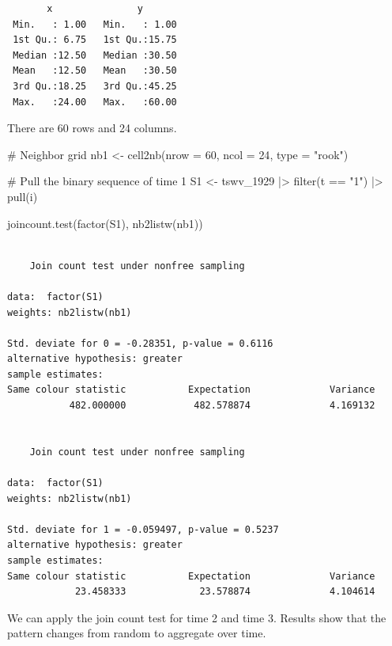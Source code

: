 \documentclass[
  letterpaper,
]{book}
\newenvironment{Shaded}{\begin{snugshade}}{\end{snugshade}}
\newcommand{\AttributeTok}[1]{\textcolor[rgb]{0.40,0.45,0.13}{#1}}
\newcommand{\CommentTok}[1]{\textcolor[rgb]{0.37,0.37,0.37}{#1}}
\newcommand{\DecValTok}[1]{\textcolor[rgb]{0.68,0.00,0.00}{#1}}
\newcommand{\FunctionTok}[1]{\textcolor[rgb]{0.28,0.35,0.67}{#1}}
\newcommand{\NormalTok}[1]{\textcolor[rgb]{0.00,0.23,0.31}{#1}}
\newcommand{\OtherTok}[1]{\textcolor[rgb]{0.00,0.23,0.31}{#1}}
\newcommand{\SpecialCharTok}[1]{\textcolor[rgb]{0.37,0.37,0.37}{#1}}
\newcommand{\StringTok}[1]{\textcolor[rgb]{0.13,0.47,0.30}{#1}}
\begin{document}
\begin{verbatim}
       x               y        
 Min.   : 1.00   Min.   : 1.00  
 1st Qu.: 6.75   1st Qu.:15.75  
 Median :12.50   Median :30.50  
 Mean   :12.50   Mean   :30.50  
 3rd Qu.:18.25   3rd Qu.:45.25  
 Max.   :24.00   Max.   :60.00  
\end{verbatim}

There are 60 rows and 24 columns.

\begin{Shaded}
\begin{Highlighting}[]
\CommentTok{\# Neighbor grid}
\NormalTok{nb1 }\OtherTok{\textless{}{-}} \FunctionTok{cell2nb}\NormalTok{(}\AttributeTok{nrow =} \DecValTok{60}\NormalTok{,}
               \AttributeTok{ncol =} \DecValTok{24}\NormalTok{,}
               \AttributeTok{type =} \StringTok{"rook"}\NormalTok{)}

\CommentTok{\# Pull the binary sequence of time 1}
\NormalTok{S1 }\OtherTok{\textless{}{-}}\NormalTok{ tswv\_1929 }\SpecialCharTok{|\textgreater{}}
  \FunctionTok{filter}\NormalTok{(t }\SpecialCharTok{==} \StringTok{"1"}\NormalTok{) }\SpecialCharTok{|\textgreater{}}
  \FunctionTok{pull}\NormalTok{(i)}

\FunctionTok{joincount.test}\NormalTok{(}\FunctionTok{factor}\NormalTok{(S1),}
               \FunctionTok{nb2listw}\NormalTok{(nb1))}
\end{Highlighting}
\end{Shaded}

\begin{verbatim}

    Join count test under nonfree sampling

data:  factor(S1) 
weights: nb2listw(nb1) 

Std. deviate for 0 = -0.28351, p-value = 0.6116
alternative hypothesis: greater
sample estimates:
Same colour statistic           Expectation              Variance 
           482.000000            482.578874              4.169132 


    Join count test under nonfree sampling

data:  factor(S1) 
weights: nb2listw(nb1) 

Std. deviate for 1 = -0.059497, p-value = 0.5237
alternative hypothesis: greater
sample estimates:
Same colour statistic           Expectation              Variance 
            23.458333             23.578874              4.104614 
\end{verbatim}

We can apply the join count test for time 2 and time 3. Results show
that the pattern changes from random to aggregate over time.
\end{document}
